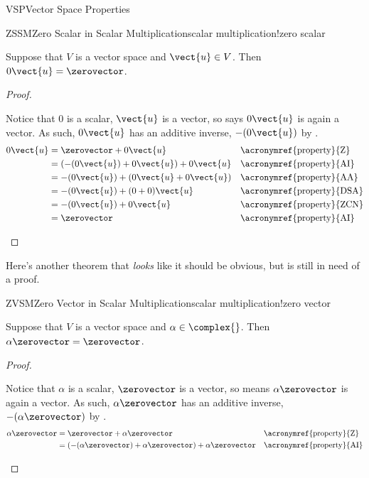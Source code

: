 \begin{subsect}{VSP}{Vector Space Properties}
\begin{theorem}{ZSSM}{Zero Scalar in Scalar Multiplication}{scalar multiplication!zero scalar}
%
\begin{para}Suppose that $V$ is a vector space and $\vect{u}\in V$.  Then $0\vect{u}=\zerovector$.\end{para}
%
\end{theorem}
%
\begin{proof}
\begin{para}Notice that $0$ is a scalar, $\vect{u}$ is a vector, so  says $0\vect{u}$ is again a vector.  As such, $0\vect{u}$ has an additive inverse, $-(0\vect{u})$ by .
%
\begin{align*}
0\vect{u}
&=\zerovector+0\vect{u}&&\text{\acronymref{property}{Z}}\\
&=\left(-(0\vect{u}) + 0\vect{u}\right)+0\vect{u}&&\text{\acronymref{property}{AI}}\\
&=-(0\vect{u}) + \left(0\vect{u}+0\vect{u}\right)&&\text{\acronymref{property}{AA}}\\
&=-(0\vect{u}) + (0+0)\vect{u}&&\text{\acronymref{property}{DSA}}\\
&=-(0\vect{u}) + 0\vect{u}&&\text{\acronymref{property}{ZCN}}\\
&=\zerovector&&\text{\acronymref{property}{AI}}
%
\end{align*}
\end{para}
%
\end{proof}
%
\begin{para}Here's another theorem that {\em looks} like it should be obvious, but is still in need of a proof.\end{para}
%
\begin{theorem}{ZVSM}{Zero Vector in Scalar Multiplication}{scalar multiplication!zero vector}
%
\begin{para}Suppose that $V$ is a vector space and $\alpha\in\complex{\null}$.   Then $\alpha\zerovector=\zerovector$.\end{para}
%
\end{theorem}
%
\begin{proof}
\begin{para}Notice that $\alpha$ is a scalar, $\zerovector$ is a vector, so  means $\alpha\zerovector$ is again a vector.  As such, $\alpha\zerovector$ has an additive inverse, $-(\alpha\zerovector)$ by .
%
\begin{align*}
\alpha\zerovector
&=\zerovector+\alpha\zerovector&&\text{\acronymref{property}{Z}}\\
&=\left(-(\alpha\zerovector)+\alpha\zerovector\right)+\alpha\zerovector&&\text{\acronymref{property}{AI}}\\

\end{align*}
\end{para}
\end{proof}
\end{subsect}
